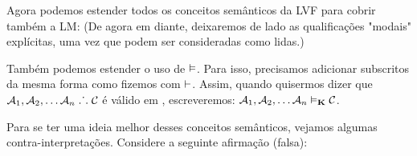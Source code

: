 Agora podemos estender todos os conceitos semânticos da  LVF para cobrir também a LM:
(De agora em diante, deixaremos de lado as qualificações "modais"  explícitas, uma vez que podem ser consideradas como lidas.)


Também podemos estender o uso de $\vDash$. Para isso, precisamos adicionar subscritos da mesma forma como fizemos com $\vdash$. Assim, quando quisermos dizer que $\mathcal{A}_1,\mathcal{A}_2, \dots \mathcal{A}_n\mathrel{\ldotp\dot{}\,\ldotp}\mathcal{C}$  é válido em \mlK, escreveremos: $\mathcal{A}_1,\mathcal{A}_2, \dots \mathcal{A}_n\vDash_{\mathbf{K}}\mathcal{C}$. 

Para se ter uma ideia melhor desses conceitos semânticos, vejamos algumas contra-interpretações. Considere a seguinte afirmação (falsa):

